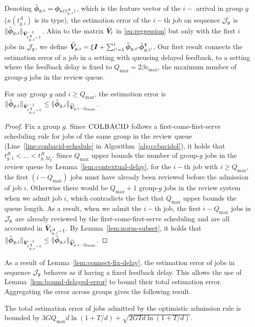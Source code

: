 Denoting $\hat{\boldsymbol{\phi}}_{g,i} = \boldsymbol{\phi}_{\kappa(t_{g,i}^A)}$, which is the feature vector of the $i-$ arrival in group $g$ ($\kappa(t_{g,i}^A)$ is its type), the estimation error of the $i-$th job on sequence $\mathcal{J}_g$ is $\|\hat{\boldsymbol{\phi}}_{g,i}\|_{\bar{\boldsymbol{V}}_{t_{g,i}^A - 1}^{-1}}$. Akin to the matrix $\bar{\boldsymbol{V}}_t$ in \eqref{eq:regression} but only with the first $i$ jobs in $\mathcal{J}_g$, we define $\widehat{\boldsymbol{V}}_{g,i} = \xi \boldsymbol{I}+\sum_{i'=1}^i \hat{\boldsymbol{\phi}}_{g,i'}\hat{\boldsymbol{\phi}}_{g,i'}^{\intercal}$. Our first result connects the estimation error of a job in a setting with queueing delayed feedback, to a setting where the feedback delay is fixed to $Q_{\max}=2\beta c_{\max}$, the maximum number of group-$g$ jobs in the review queue.
\begin{lemma}\label{lem:connect-fix-delay}
For any group $g$ and $i \geq Q_{\max}$, the estimation error is $\|\hat{\boldsymbol{\phi}}_{g,i}\|_{\bar{\boldsymbol{V}}_{t_{g,i}^A - 1}^{-1}} \leq \|\hat{\boldsymbol{\phi}}_{g,i}\|_{\widehat{\boldsymbol{V}}_{g,i - Q_{\max}}}$.
\end{lemma}
\begin{proof}
Fix a group $g$. Since $\textsc{COLBACID}$ follows a first-come-first-serve scheduling rule for jobs of the same group in the review queue (Line~\ref{line:conbacid-schedule} in Algorithm~\ref{algo:cbacidol}), it holds that $t_{g,1}^R < \ldots < t_{g,M_g}^R$. Since $Q_{\max}$ upper bounds the number of group-$g$ jobs in the review queue by Lemma~\ref{lem:contextual-delay}, for the $i-$th job with $i \geq Q_{\max}$, the first $(i-Q_{\max})$ jobs must have already been reviewed before the admission of job $i$. Otherwise there would be $Q_{\max}+1$ group-$g$ jobs in the review system when we admit job $i$, which contradicts the fact that $Q_{\max}$ upper bounds the queue length. As a result, when we admit the $i-$th job, the first $i-Q_{\max}$ jobs in $\mathcal{J}_g$ are already reviewed by the first-come-first-serve scheduling and are all accounted in $\bar{\boldsymbol{V}}_{t_{g,i}^A - 1}$. By Lemma~\ref{lem:norm-subset}, it holds that $\|\hat{\boldsymbol{\phi}}_{g,i}\|_{\bar{\boldsymbol{V}}_{t_{g,i}^A - 1}^{-1}} \leq \|\hat{\boldsymbol{\phi}}_{g,i}\|_{\widehat{\boldsymbol{V}}_{g,i - Q_{\max}}}$. 
\end{proof}
As a result of Lemma~\ref{lem:connect-fix-delay}, the estimation error of jobs in sequence $\mathcal{J}_g$ behaves as if having a fixed feedback delay. This allows the use of Lemma~\ref{lem:bound-delayed-error} to bound their total estimation error. Aggregating the error across groups gives the following result.
\begin{lemma}\label{lem:error-total}
The total estimation error of jobs admitted by the optimistic admission rule is bounded by $3GQ_{\max}d\ln(1+T/d) + \sqrt{2GTd\ln(1+T/d)}$.
\end{lemma}
